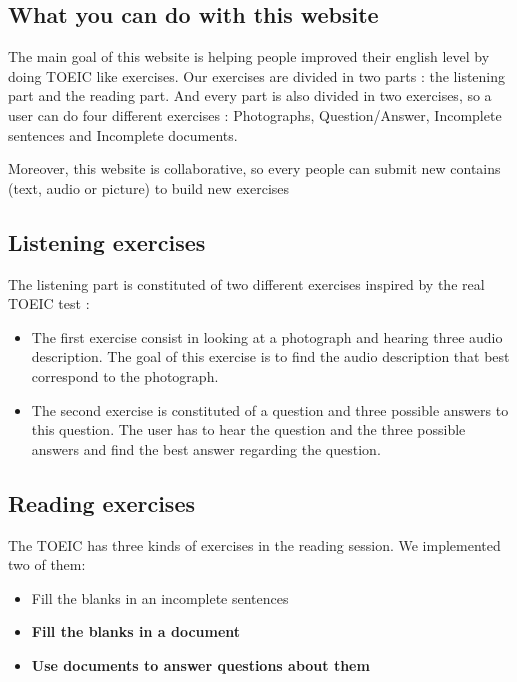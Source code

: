 \documentclass[12pt,a4paper]{report}
\begin{document}
\subsection{What you can do with this website}

The main goal of this website is helping people improved their english level by doing TOEIC like exercises. Our exercises are divided in two parts : the listening part and the reading part. And every part is also divided in two exercises, so a user can do four different exercises : Photographs, Question/Answer, Incomplete sentences and Incomplete documents.

Moreover, this website is collaborative, so every people can submit new contains (text, audio or picture) to build new exercises

\subsection{Listening exercises}

The listening part is constituted of two different exercises inspired by the real TOEIC test :

\begin{itemize}
\item The first exercise consist in looking at a photograph and hearing three audio description. The goal of this exercise is to find the audio description that best correspond to the photograph.

\item The second exercise is constituted of a question and three possible answers to this question. The user has to hear the question and the three possible answers and find the best answer regarding the question.
\end{itemize}

\subsection{Reading exercises}
The TOEIC has three kinds of exercises in the reading session. We implemented
two of them:

\begin{itemize}
\item Fill the blanks in an incomplete sentences
\item \textbf{Fill the blanks in a document}
\item \textbf{Use documents to answer questions about them}
\end{itemize}
\end{document}
